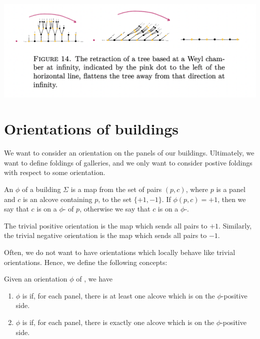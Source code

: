 \documentclass[11pt]{article}
\begin{document}
\includegraphics[scale=0.7]{Screenshot 2023-02-15 at 13.31.58.png}


\section{Orientations of buildings}

We want to consider an orientation on the panels of our buildings. Ultimately, we want to define foldings of galleries, and we only want to consider postive foldings with respect to some orientation.


\begin{definition}
    An  $\phi$ of a building $\Sigma$ is a map from the set of pairs $(p,c)$, where $p$ is a panel and $c$ is an alcove containing $p$, to the set $\{+1,-1\}$. If $\phi (p,c)=+1$, then we say that $c$ is on a $\phi$- of $p$, otherwise we say that $c$ is on a $\phi$-. 
\end{definition}


\begin{example}
    The trivial positive orientation is the map which sends all pairs to $+1$. Similarly, the trivial negative orientation is the map which sends all pairs to $-1$. 
\end{example}

Often, we do not want to have orientations which locally behave like trivial orientations. Hence, we define the following concepts:

\begin{definition}
    Given an orientation $\phi$ of \sg, we have
    \begin{enumerate}
        \item $\phi$ is  if, for each panel, there is at least one alcove which is on the $\phi$-positive side.
        \item $\phi$ is  if, for each panel, there is exactly one alcove which is on the $\phi$-positive side.
    \end{enumerate}
\end{definition}
\end{document}
